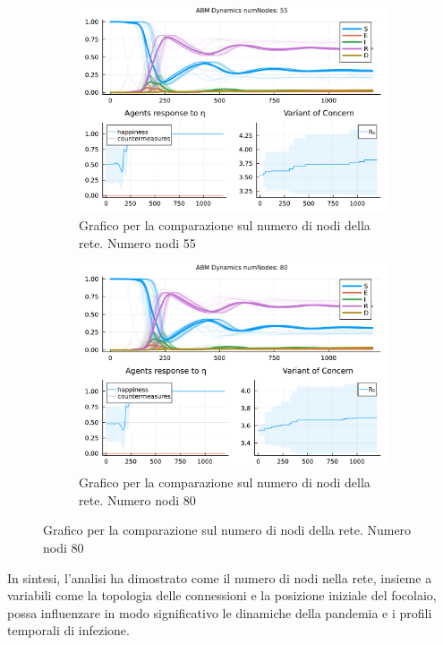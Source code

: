 \begin{figure}[!hb]
\begin{subfigure}[b]{0.45\textwidth}
		\includegraphics[width=\textwidth]{img/SocialNetworkABM_3_NN.pdf}
		\caption{Grafico per la comparazione sul numero di nodi della rete. Numero nodi 55}
		\label{fig:comparison_numberOfNodes_55}
	\end{subfigure}
	\hfill
	\begin{subfigure}[b]{0.45\textwidth}
		\centering
		\includegraphics[width=\textwidth]{img/SocialNetworkABM_4_NN.pdf}
		\caption{Grafico per la comparazione sul numero di nodi della rete. Numero nodi 80}
		\label{fig:comparison_numberOfNodes_80}
	\end{subfigure}
\end{figure}

In sintesi, l'analisi ha dimostrato come il numero di nodi nella rete, 
insieme a variabili come la topologia delle connessioni e la posizione 
iniziale del focolaio, possa influenzare in modo significativo le 
dinamiche della pandemia e i profili temporali di infezione.
\newpage

